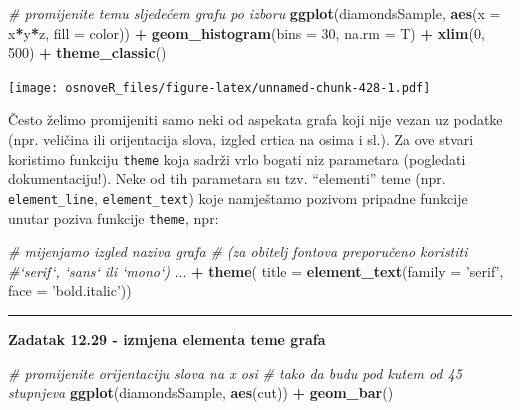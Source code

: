 \documentclass[]{book}
\newenvironment{Shaded}{\begin{snugshade}}{\end{snugshade}}
\newcommand{\KeywordTok}[1]{\textcolor[rgb]{0.13,0.29,0.53}{\textbf{#1}}}
\newcommand{\DataTypeTok}[1]{\textcolor[rgb]{0.13,0.29,0.53}{#1}}
\newcommand{\DecValTok}[1]{\textcolor[rgb]{0.00,0.00,0.81}{#1}}
\newcommand{\StringTok}[1]{\textcolor[rgb]{0.31,0.60,0.02}{#1}}
\newcommand{\CommentTok}[1]{\textcolor[rgb]{0.56,0.35,0.01}{\textit{#1}}}
\newcommand{\OperatorTok}[1]{\textcolor[rgb]{0.81,0.36,0.00}{\textbf{#1}}}
\newcommand{\NormalTok}[1]{#1}
\theoremstyle{definition}
\theoremstyle{definition}
\theoremstyle{definition}
\theoremstyle{remark}
\begin{document}
\begin{Shaded}
\begin{Highlighting}[]
\CommentTok{# promijenite temu sljedećem grafu po izboru}
\KeywordTok{ggplot}\NormalTok{(diamondsSample, }\KeywordTok{aes}\NormalTok{(}\DataTypeTok{x =}\NormalTok{ x}\OperatorTok{*}\NormalTok{y}\OperatorTok{*}\NormalTok{z, }\DataTypeTok{fill =}\NormalTok{ color)) }\OperatorTok{+}\StringTok{ }
\StringTok{  }\KeywordTok{geom_histogram}\NormalTok{(}\DataTypeTok{bins =} \DecValTok{30}\NormalTok{, }\DataTypeTok{na.rm =}\NormalTok{ T) }\OperatorTok{+}\StringTok{ }
\StringTok{  }\KeywordTok{xlim}\NormalTok{(}\DecValTok{0}\NormalTok{, }\DecValTok{500}\NormalTok{) }\OperatorTok{+}\StringTok{ }\KeywordTok{theme_classic}\NormalTok{()}
\end{Highlighting}
\end{Shaded}

\texttt{[image: osnoveR\_files/figure-latex/unnamed-chunk-428-1.pdf]}

Često želimo promijeniti samo neki od aspekata grafa koji nije vezan uz
podatke (npr. veličina ili orijentacija slova, izgled crtica na osima i
sl.). Za ove stvari koristimo funkciju \texttt{theme} koja sadrži vrlo
bogati niz parametara (pogledati dokumentaciju!). Neke od tih parametara
su tzv. ``elementi'' teme (npr. \texttt{element\_line},
\texttt{element\_text}) koje namještamo pozivom pripadne funkcije unutar
poziva funkcije \texttt{theme}, npr:

\begin{Shaded}
\begin{Highlighting}[]
\CommentTok{# mijenjamo izgled naziva grafa }
\CommentTok{# (za obitelj fontova preporučeno koristiti }
\CommentTok{#`serif`, `sans` ili `mono`)}
\NormalTok{... }\OperatorTok{+}\StringTok{ }\KeywordTok{theme}\NormalTok{( }\DataTypeTok{title =} \KeywordTok{element_text}\NormalTok{(}\DataTypeTok{family =} \StringTok{'serif'}\NormalTok{, }\DataTypeTok{face =} \StringTok{'bold.italic'}\NormalTok{))}
\end{Highlighting}
\end{Shaded}

\begin{center}\rule{0.5\linewidth}{\linethickness}\end{center}

\textbf{Zadatak 12.29 - izmjena elementa teme grafa}

\begin{Shaded}
\begin{Highlighting}[]
\CommentTok{# promijenite orijentaciju slova na x osi }
\CommentTok{# tako da budu pod kutem od 45 stupnjeva}
\KeywordTok{ggplot}\NormalTok{(diamondsSample, }\KeywordTok{aes}\NormalTok{(cut)) }\OperatorTok{+}\StringTok{ }\KeywordTok{geom_bar}\NormalTok{() }
\end{Highlighting}
\end{Shaded}
\end{document}
